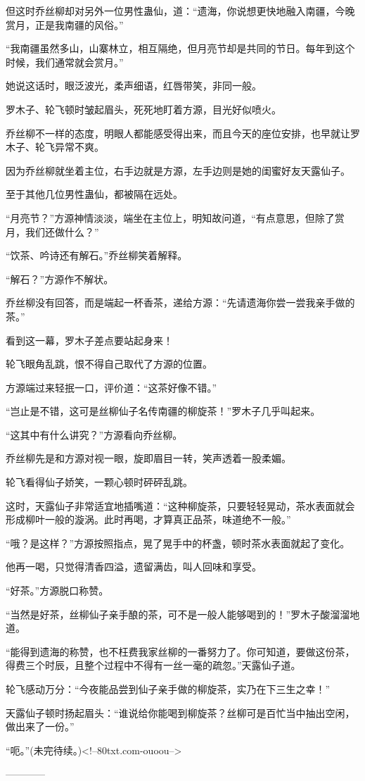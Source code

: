 \begin{this_body}
但这时乔丝柳却对另外一位男性蛊仙，道：“遗海，你说想更快地融入南疆，今晚赏月，正是我南疆的风俗。”

“我南疆虽然多山，山寨林立，相互隔绝，但月亮节却是共同的节日。每年到这个时候，我们通常就会赏月。”

她说这话时，眼泛波光，柔声细语，红唇带笑，非同一般。

罗木子、轮飞顿时皱起眉头，死死地盯着方源，目光好似喷火。

乔丝柳不一样的态度，明眼人都能感受得出来，而且今天的座位安排，也早就让罗木子、轮飞异常不爽。

因为乔丝柳就坐着主位，右手边就是方源，左手边则是她的闺蜜好友天露仙子。

至于其他几位男性蛊仙，都被隔在远处。

“月亮节？”方源神情淡淡，端坐在主位上，明知故问道，“有点意思，但除了赏月，我们还做什么？”

“饮茶、吟诗还有解石。”乔丝柳笑着解释。

“解石？”方源作不解状。

乔丝柳没有回答，而是端起一杯香茶，递给方源：“先请遗海你尝一尝我亲手做的茶。”

看到这一幕，罗木子差点要站起身来！

轮飞眼角乱跳，恨不得自己取代了方源的位置。

方源端过来轻抿一口，评价道：“这茶好像不错。”

“岂止是不错，这可是丝柳仙子名传南疆的柳旋茶！”罗木子几乎叫起来。

“这其中有什么讲究？”方源看向乔丝柳。

乔丝柳先是和方源对视一眼，旋即眉目一转，笑声透着一股柔媚。

轮飞看得仙子娇笑，一颗心顿时砰砰乱跳。

这时，天露仙子非常适宜地插嘴道：“这种柳旋茶，只要轻轻晃动，茶水表面就会形成柳叶一般的漩涡。此时再喝，才算真正品茶，味道绝不一般。”

“哦？是这样？”方源按照指点，晃了晃手中的杯盏，顿时茶水表面就起了变化。

他再一喝，只觉得清香四溢，遗留满齿，叫人回味和享受。

“好茶。”方源脱口称赞。

“当然是好茶，丝柳仙子亲手酿的茶，可不是一般人能够喝到的！”罗木子酸溜溜地道。

“能得到遗海的称赞，也不枉费我家丝柳的一番努力了。你可知道，要做这份茶，得费三个时辰，且整个过程中不得有一丝一毫的疏忽。”天露仙子道。

轮飞感动万分：“今夜能品尝到仙子亲手做的柳旋茶，实乃在下三生之幸！”

天露仙子顿时扬起眉头：“谁说给你能喝到柳旋茶？丝柳可是百忙当中抽出空闲，做出来了一份。”

“呃。”(未完待续。)<!--80txt.com-ouoou-->

------------

\end{this_body}

